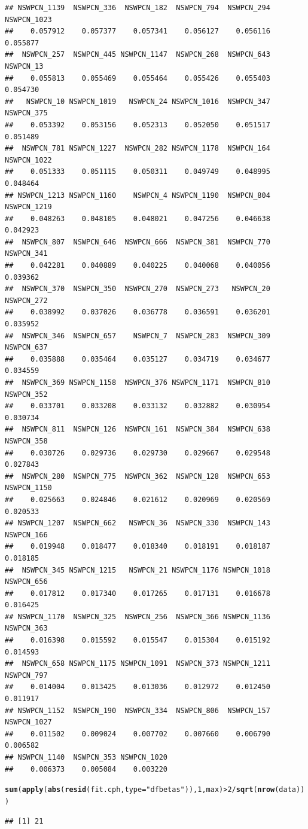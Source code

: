\documentclass{article}\usepackage[]{graphicx}\usepackage[]{color}
\makeatletter
\newcommand{\hlnum}[1]{\textcolor[rgb]{0.686,0.059,0.569}{#1}}%
\newcommand{\hlstr}[1]{\textcolor[rgb]{0.192,0.494,0.8}{#1}}%
\newcommand{\hlopt}[1]{\textcolor[rgb]{0,0,0}{#1}}%
\newcommand{\hlstd}[1]{\textcolor[rgb]{0.345,0.345,0.345}{#1}}%
\newcommand{\hlkwc}[1]{\textcolor[rgb]{0.333,0.667,0.333}{#1}}%
\newcommand{\hlkwd}[1]{\textcolor[rgb]{0.737,0.353,0.396}{\textbf{#1}}}%
\newenvironment{kframe}{%
 \def\at@end@of@kframe{}%
 \ifinner\ifhmode%
  \def\at@end@of@kframe{\end{minipage}}%
  \begin{minipage}{\columnwidth}%
 \fi\fi%
 \def\FrameCommand##1{\hskip\@totalleftmargin \hskip-\fboxsep
 \colorbox{shadecolor}{##1}\hskip-\fboxsep
     \hskip-\linewidth \hskip-\@totalleftmargin \hskip\columnwidth}%
 \MakeFramed {\advance\hsize-\width
   \@totalleftmargin\z@ \linewidth\hsize
   \@setminipage}}%
 {\par\unskip\endMakeFramed%
 \at@end@of@kframe}
\newenvironment{knitrout}{}{} %
\makeatother
\begin{document}
\begin{knitrout}
\begin{kframe}
\begin{verbatim}
## NSWPCN_1139  NSWPCN_336  NSWPCN_182  NSWPCN_794  NSWPCN_294 NSWPCN_1023 
##    0.057912    0.057377    0.057341    0.056127    0.056116    0.055877 
##  NSWPCN_257  NSWPCN_445 NSWPCN_1147  NSWPCN_268  NSWPCN_643   NSWPCN_13 
##    0.055813    0.055469    0.055464    0.055426    0.055403    0.054730 
##   NSWPCN_10 NSWPCN_1019   NSWPCN_24 NSWPCN_1016  NSWPCN_347  NSWPCN_375 
##    0.053392    0.053156    0.052313    0.052050    0.051517    0.051489 
##  NSWPCN_781 NSWPCN_1227  NSWPCN_282 NSWPCN_1178  NSWPCN_164 NSWPCN_1022 
##    0.051333    0.051115    0.050311    0.049749    0.048995    0.048464 
## NSWPCN_1213 NSWPCN_1160    NSWPCN_4 NSWPCN_1190  NSWPCN_804 NSWPCN_1219 
##    0.048263    0.048105    0.048021    0.047256    0.046638    0.042923 
##  NSWPCN_807  NSWPCN_646  NSWPCN_666  NSWPCN_381  NSWPCN_770  NSWPCN_341 
##    0.042281    0.040889    0.040225    0.040068    0.040056    0.039362 
##  NSWPCN_370  NSWPCN_350  NSWPCN_270  NSWPCN_273   NSWPCN_20  NSWPCN_272 
##    0.038992    0.037026    0.036778    0.036591    0.036201    0.035952 
##  NSWPCN_346  NSWPCN_657    NSWPCN_7  NSWPCN_283  NSWPCN_309  NSWPCN_637 
##    0.035888    0.035464    0.035127    0.034719    0.034677    0.034559 
##  NSWPCN_369 NSWPCN_1158  NSWPCN_376 NSWPCN_1171  NSWPCN_810  NSWPCN_352 
##    0.033701    0.033208    0.033132    0.032882    0.030954    0.030734 
##  NSWPCN_811  NSWPCN_126  NSWPCN_161  NSWPCN_384  NSWPCN_638  NSWPCN_358 
##    0.030726    0.029736    0.029730    0.029667    0.029548    0.027843 
##  NSWPCN_280  NSWPCN_775  NSWPCN_362  NSWPCN_128  NSWPCN_653 NSWPCN_1150 
##    0.025663    0.024846    0.021612    0.020969    0.020569    0.020533 
## NSWPCN_1207  NSWPCN_662   NSWPCN_36  NSWPCN_330  NSWPCN_143  NSWPCN_166 
##    0.019948    0.018477    0.018340    0.018191    0.018187    0.018185 
##  NSWPCN_345 NSWPCN_1215   NSWPCN_21 NSWPCN_1176 NSWPCN_1018  NSWPCN_656 
##    0.017812    0.017340    0.017265    0.017131    0.016678    0.016425 
## NSWPCN_1170  NSWPCN_325  NSWPCN_256  NSWPCN_366 NSWPCN_1136  NSWPCN_363 
##    0.016398    0.015592    0.015547    0.015304    0.015192    0.014593 
##  NSWPCN_658 NSWPCN_1175 NSWPCN_1091  NSWPCN_373 NSWPCN_1211  NSWPCN_797 
##    0.014004    0.013425    0.013036    0.012972    0.012450    0.011917 
## NSWPCN_1152  NSWPCN_190  NSWPCN_334  NSWPCN_806  NSWPCN_157 NSWPCN_1027 
##    0.011502    0.009024    0.007702    0.007660    0.006790    0.006582 
## NSWPCN_1140  NSWPCN_353 NSWPCN_1020 
##    0.006373    0.005084    0.003220
\end{verbatim}
\begin{alltt}
\hlkwd{sum}\hlstd{(}\hlkwd{apply}\hlstd{(}\hlkwd{abs}\hlstd{(}\hlkwd{resid}\hlstd{(fit.cph,} \hlkwc{type} \hlstd{=} \hlstr{"dfbetas"}\hlstd{)),} \hlnum{1}\hlstd{, max)} \hlopt{>} \hlnum{2}\hlopt{/}\hlkwd{sqrt}\hlstd{(}\hlkwd{nrow}\hlstd{(data)))}
\end{alltt}
\begin{verbatim}
## [1] 21
\end{verbatim}
\end{kframe}
\end{knitrout}
\end{document}
